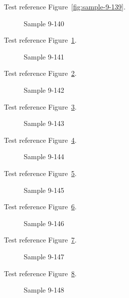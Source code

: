Test reference Figure~\ref{fig:sample-9-139}.

\begin{figure}[tbhp]
\caption{Sample 9-140}
\label{fig:sample-9-140}
\end{figure}

Test reference Figure~\ref{fig:sample-9-140}.

\begin{figure}[tbhp]
\caption{Sample 9-141}
\label{fig:sample-9-141}
\end{figure}

Test reference Figure~\ref{fig:sample-9-141}.

\begin{figure}[tbhp]
\caption{Sample 9-142}
\label{fig:sample-9-142}
\end{figure}

Test reference Figure~\ref{fig:sample-9-142}.

\begin{figure}[tbhp]
\caption{Sample 9-143}
\label{fig:sample-9-143}
\end{figure}

Test reference Figure~\ref{fig:sample-9-143}.

\begin{figure}[tbhp]
\caption{Sample 9-144}
\label{fig:sample-9-144}
\end{figure}

Test reference Figure~\ref{fig:sample-9-144}.

\begin{figure}[tbhp]
\caption{Sample 9-145}
\label{fig:sample-9-145}
\end{figure}

Test reference Figure~\ref{fig:sample-9-145}.

\begin{figure}[tbhp]
\caption{Sample 9-146}
\label{fig:sample-9-146}
\end{figure}

Test reference Figure~\ref{fig:sample-9-146}.

\begin{figure}[tbhp]
\caption{Sample 9-147}
\label{fig:sample-9-147}
\end{figure}

Test reference Figure~\ref{fig:sample-9-147}.

\begin{figure}[tbhp]
\caption{Sample 9-148}
\label{fig:sample-9-148}
\end{figure}

